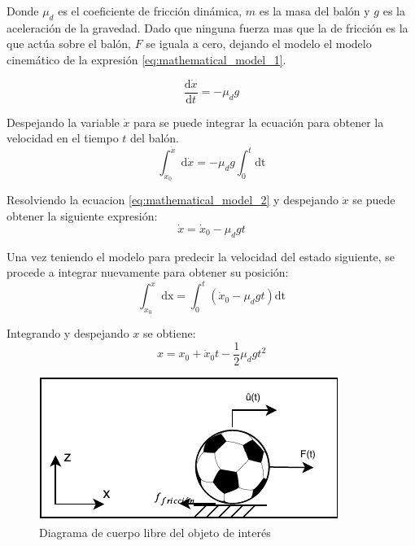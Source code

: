 Donde $\mu_d$ es el coeficiente de fricción dinámica, $m$ es la masa del balón y $g$ es la aceleración de la gravedad. Dado que ninguna fuerza mas que la de fricción es la que actúa sobre el balón, $F$ se iguala a cero, dejando el modelo el modelo cinemático de la expresión \ref{eq:mathematical_model_1}.

\begin{equation}
\frac{\mathrm{d} \dot{x}}{\mathrm{d} t} = - \mu_d g
\label{eq:mathematical_model_1}
\end{equation}

Despejando la variable $\dot{x}$ para se puede integrar la ecuación para obtener la velocidad en el tiempo $t$ del balón.
\begin{equation}
\int_{\dot{x}_0}^{\dot{x}} \mathrm{d} \dot{x} = -\mu_d g \int_{0}^{t} \mathrm{dt}  
\label{eq:mathematical_model_2}
\end{equation}

Resolviendo la ecuacion \ref{eq:mathematical_model_2} y despejando $\dot{x}$ se puede obtener la siguiente expresión:
\begin{equation}
\dot{x} = \dot{x}_{0} - \mu_d g t 
\label{eq:velocity_prediction}
\end{equation}

Una vez teniendo el modelo para predecir la velocidad del estado siguiente, se procede a integrar nuevamente para obtener su posición:
\begin{equation}
\int_{x_{0}}^{x} \mathrm{dx} = \int_{0}^{t} (\dot{x}_{0} - \mu_d g t) \mathrm{dt}
\label{eq:mathematical_model_4}
\end{equation}

Integrando y despejando $x$ se obtiene:
\begin{equation}
x = x_0 + \dot{x}_0 t - \frac{1}{2} \mu_d g t^2
\label{eq:position_prediction}
\end{equation}

\begin{figure}
\centering
\includegraphics[scale=1.5]{images/dynamic_model.pdf}
\caption{Diagrama de cuerpo libre del objeto de interés}
\label{fig:dynamic_model}
\end{figure}

